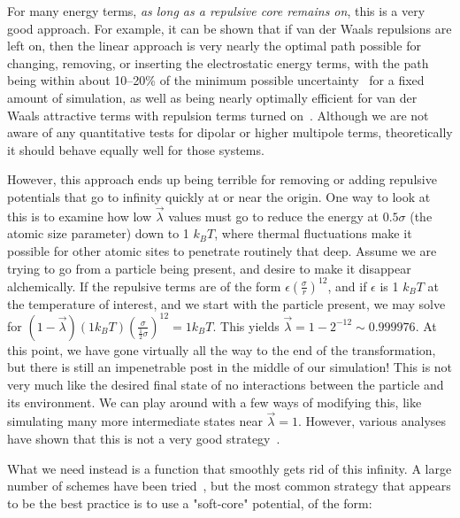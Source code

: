 \documentclass[9pt,bestpractices]{livecoms}
\begin{document}
For many energy terms, \textit{as long as a repulsive core remains on}, this is a very good approach. For example, it can be shown that if van der Waals repulsions are left on, then the linear approach is very nearly the optimal path possible for changing, removing, or inserting the electrostatic energy terms, with the path being within about 10--20\% of the minimum possible uncertainty~\cite{naden2015linear} for a fixed amount of simulation, as well as being nearly optimally efficient for van der Waals attractive terms with repulsion terms turned on~\cite{naden2014linear}. Although we are not aware of any quantitative tests for dipolar or higher multipole terms, theoretically it should behave equally well for those systems.

However, this approach ends up being terrible for removing or adding repulsive potentials that go to infinity quickly at or near the origin. One way to look at this is to examine how low $\vec{\lambda}$ values must go to reduce the energy at $0.5\sigma$ (the atomic size parameter) down to 1 $k_BT$, where thermal fluctuations make it possible for other atomic sites to penetrate routinely that deep. Assume we are trying to go from a particle being present, and desire to make it disappear alchemically. If the repulsive terms are of the form $\epsilon(\frac{\sigma}{r})^{12}$, and if $\epsilon$ is 1 $k_BT$ at the temperature of interest, and we start with the particle present, we may solve for $(1-\vec{\lambda})(1 k_B T)\left(\frac{\sigma}{\frac{1}{2}\sigma}\right)^{12} = 1 k_B T$. This yields $\vec{\lambda} = 1-2^{-12} \sim 0.999976$. At this point,  we have gone virtually all the way to the end of the transformation, but there is still an impenetrable post in the middle of our simulation! This is not very much like the desired final state of no interactions between the particle and its environment. We can play around with a few ways of modifying this, like simulating many more intermediate states near $\vec{\lambda}=1$. However, various analyses have shown that this is not a very good strategy~\cite{pham2011identifying, beutler1994avoiding, zacharias1994separationshifted, blondel2004ensemble, gapsys2012new}.

What we need instead is a function that smoothly gets rid of this infinity. A large number of schemes have been tried~\cite{beutler1994avoiding, zacharias1994separationshifted, blondel2004ensemble, pham2011identifying, pham2012optimal, naden2014linear, donnini2005incorporating}, but the most common strategy that appears to be the best practice is to use a "soft-core" potential, of the form:
\end{document}

